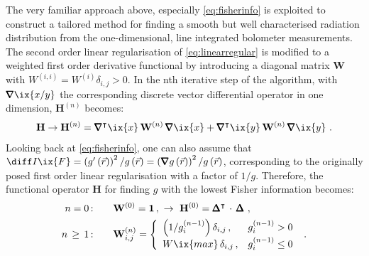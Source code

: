         The very familiar approach above, especially \cref{eq:fisherinfo} is exploited to construct a tailored method for finding a smooth but well characterised radiation distribution from the one-dimensional, line integrated bolometer measurements. The second order linear regularisation of \cref{eq:linearregular} is modified to a weighted first order derivative functional by introducing a diagonal matrix $\mathbf{W}$ with $W^{\left(i,i\right)}=W^{\left(i\right)}\delta_{i,j}>0$. In the nth iterative step of the algorithm, with $\pmb{\nabla}\ix{x/y}$ the corresponding discrete vector differential operator in one dimension, $\mathbf{H}^{\left(n\right)}$ becomes:
%
        \begin{align}%
            \mathbf{H}\to\mathbf{H}^{\left(n\right)}=\pmb{\nabla}^{\intercal}\ix{x}\,\mathbf{W}^{\left(n\right)}\,\pmb{\nabla}\ix{x}+\pmb{\nabla}^{\intercal}\ix{y}\,\mathbf{W}^{\left(n\right)}\,\pmb{\nabla}\ix{y}\,\,.%
        \end{align}%
%
        Looking back at \cref{eq:fisherinfo}, one can also assume that $\diff I\ix{F}=\left(g^{\prime}\left(\vec{r}\right)\right)^{2}/g\left(\vec{r}\right)=\left(\pmb{\nabla}g\left(\vec{r}\right)\right)^{2}/g\left(\vec{r}\right)$, corresponding to the originally posed first order linear regularisation with a factor of $1/g$. Therefore, the functional operator $\mathbf{H}$ for finding $g$ with the lowest Fisher information becomes:%
%
        \begin{align}%
            \begin{split}%
                n=0\,\text{:}&\qquad\mathbf{W}^{\left(0\right)}=\mathbf{1}\,,\,\,\to\,\,\mathbf{H}^{\left(0\right)}=\pmb{\Delta}^{\intercal}\,\cdot\,\pmb{\Delta}\,\,,\\%
                n\,\ge\,1\,\text{:}&\qquad \mathbf{W}^{\left(n\right)}_{i,j}=\left\{\begin{array}{ll}%
                    \left(1/g_{i}^{\left(n-1\right)}\right)\delta_{i,j}\,,&g_{i}^{\left(n-1\right)}>0\\%
                    W\ix{max}\,\delta_{i,j}\,,&g_{i}^{\left(n-1\right)}\le0%
                \end{array}\right.\,\,.%
            \end{split}\label{eq:fisher_weight}%
        \end{align}%
%
